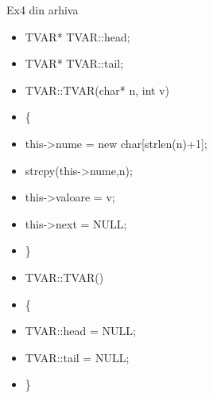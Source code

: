 \documentclass[pdf]{beamer}
\begin{document}
\begin{frame}{Ex4 din arhiva}
\begin{itemize}
\item
TVAR* TVAR::head;
\item \hspace{4mm}
TVAR* TVAR::tail;
\item \vspace{6mm} \hspace{4mm}
TVAR::TVAR(char* n, int v)
\item \hspace{4mm}
\{
\item \hspace{6mm}
this->nume = new char[strlen(n)+1];
\item \hspace{6mm}
strcpy(this->nume,n);
\item \hspace{6mm}
this->valoare = v;
\item \hspace{5mm}
this->next = NULL;
\item \hspace{4mm}
\}
\item \vspace{6mm} \hspace{4mm}
TVAR::TVAR()
\item \hspace{4mm}
\{
\item \hspace{6mm}
TVAR::head = NULL;
\item \hspace{6mm}
TVAR::tail = NULL;
\item \hspace{4mm}
\}

\end{itemize}
\end{frame}
\end{document}
